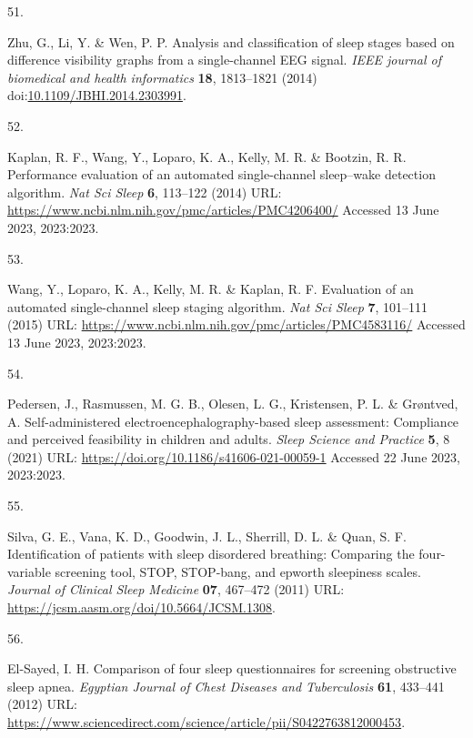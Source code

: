 \documentclass[
  10pt,
]{scrbook}
\newlength{\cslhangindent}
\newlength{\csllabelwidth}
\newlength{\cslentryspacingunit} %
\newenvironment{CSLReferences}[2] %
 {%
  \setlength{\parindent}{0pt}
  \ifodd #1
  \let\oldpar\par
  \def\par{\hangindent=\cslhangindent\oldpar}
  \fi
  \setlength{\parskip}{#2\cslentryspacingunit}
 }%
 {}
\newcommand{\CSLLeftMargin}[1]{\parbox[t]{\csllabelwidth}{#1}}
\newcommand{\CSLRightInline}[1]{\parbox[t]{\linewidth - \csllabelwidth}{#1}\break}
\begin{document}
\begin{CSLReferences}{0}{0}
\leavevmode{}%
\CSLLeftMargin{51. }%
\CSLRightInline{Zhu, G., Li, Y. \& Wen, P. P. Analysis and
classification of sleep stages based on difference visibility graphs
from a single-channel EEG signal. \emph{IEEE journal of biomedical and
health informatics} \textbf{18}, 1813--1821 (2014)
doi:\href{https://doi.org/10.1109/JBHI.2014.2303991}{10.1109/JBHI.2014.2303991}.}

\leavevmode{}%
\CSLLeftMargin{52. }%
\CSLRightInline{Kaplan, R. F., Wang, Y., Loparo, K. A., Kelly, M. R. \&
Bootzin, R. R. Performance evaluation of an automated single-channel
sleep--wake detection algorithm. \emph{Nat Sci Sleep} \textbf{6},
113--122 (2014) URL:
\url{https://www.ncbi.nlm.nih.gov/pmc/articles/PMC4206400/} Accessed 13
June 2023, 2023:2023.}

\leavevmode{}%
\CSLLeftMargin{53. }%
\CSLRightInline{Wang, Y., Loparo, K. A., Kelly, M. R. \& Kaplan, R. F.
Evaluation of an automated single-channel sleep staging algorithm.
\emph{Nat Sci Sleep} \textbf{7}, 101--111 (2015) URL:
\url{https://www.ncbi.nlm.nih.gov/pmc/articles/PMC4583116/} Accessed 13
June 2023, 2023:2023.}

\leavevmode{}%
\CSLLeftMargin{54. }%
\CSLRightInline{Pedersen, J., Rasmussen, M. G. B., Olesen, L. G.,
Kristensen, P. L. \& Grøntved, A. Self-administered
electroencephalography-based sleep assessment: Compliance and perceived
feasibility in children and adults. \emph{Sleep Science and Practice}
\textbf{5}, 8 (2021) URL:
\url{https://doi.org/10.1186/s41606-021-00059-1} Accessed 22 June 2023,
2023:2023.}

\leavevmode{}%
\CSLLeftMargin{55. }%
\CSLRightInline{Silva, G. E., Vana, K. D., Goodwin, J. L., Sherrill, D.
L. \& Quan, S. F. Identification of patients with sleep disordered
breathing: Comparing the four-variable screening tool, STOP, STOP-bang,
and epworth sleepiness scales. \emph{Journal of Clinical Sleep Medicine}
\textbf{07}, 467--472 (2011) URL:
\url{https://jcsm.aasm.org/doi/10.5664/JCSM.1308}.}

\leavevmode{}%
\CSLLeftMargin{56. }%
\CSLRightInline{El-Sayed, I. H. Comparison of four sleep questionnaires
for screening obstructive sleep apnea. \emph{Egyptian Journal of Chest
Diseases and Tuberculosis} \textbf{61}, 433--441 (2012) URL:
\url{https://www.sciencedirect.com/science/article/pii/S0422763812000453}.}


\end{CSLReferences}
\end{document}
